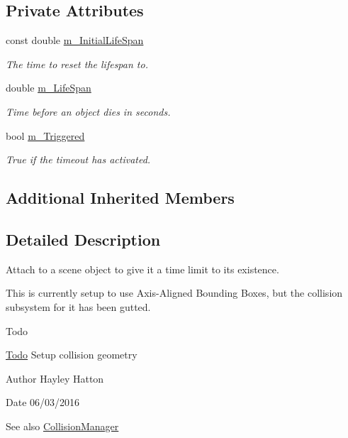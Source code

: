\subsection*{Private Attributes}
\begin{DoxyCompactItemize}
\item 
const double \hyperlink{class_life_time_component_adb6e05948b0edd9b4237861f064c9beb}{m\+\_\+\+Initial\+Life\+Span}
\begin{DoxyCompactList}\small\item\em The time to reset the lifespan to. \end{DoxyCompactList}\item 
double \hyperlink{class_life_time_component_a7a6b268136bb72e6b3d492d110681969}{m\+\_\+\+Life\+Span}
\begin{DoxyCompactList}\small\item\em Time before an object dies in seconds. \end{DoxyCompactList}\item 
bool \hyperlink{class_life_time_component_a9d1b78e698610ab263f788e29474b3bd}{m\+\_\+\+Triggered}
\begin{DoxyCompactList}\small\item\em True if the timeout has activated. \end{DoxyCompactList}\end{DoxyCompactItemize}
\subsection*{Additional Inherited Members}


\subsection{Detailed Description}
Attach to a scene object to give it a time limit to its existence. 

This is currently setup to use Axis-\/\+Aligned Bounding Boxes, but the collision subsystem for it has been gutted. \begin{DoxyRefDesc}{Todo}
\item[\hyperlink{todo__todo000002}{Todo}]Setup collision geometry\end{DoxyRefDesc}


\begin{DoxyAuthor}{Author}
Hayley Hatton 
\end{DoxyAuthor}
\begin{DoxyDate}{Date}
06/03/2016 
\end{DoxyDate}
\begin{DoxySeeAlso}{See also}
\hyperlink{class_collision_manager}{Collision\+Manager} 
\end{DoxySeeAlso}


